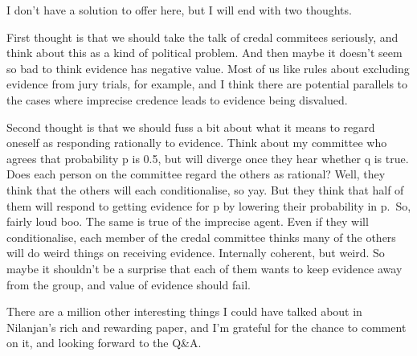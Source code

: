 \documentclass[
  12pt,
]{article}
\begin{document}
I don't have a solution to offer here, but I will end with two thoughts.

First thought is that we should take the talk of credal commitees
seriously, and think about this as a kind of political problem. And then
maybe it doesn't seem so bad to think evidence has negative value. Most
of us like rules about excluding evidence from jury trials, for example,
and I think there are potential parallels to the cases where imprecise
credence leads to evidence being disvalued.

Second thought is that we should fuss a bit about what it means to
regard oneself as responding rationally to evidence. Think about my
committee who agrees that probability p is 0.5, but will diverge once
they hear whether q is true. Does each person on the committee regard
the others as rational? Well, they think that the others will each
conditionalise, so yay. But they think that half of them will respond to
getting evidence for p by lowering their probability in p.~So, fairly
loud boo. The same is true of the imprecise agent. Even if they will
conditionalise, each member of the credal committee thinks many of the
others will do weird things on receiving evidence. Internally coherent,
but weird. So maybe it shouldn't be a surprise that each of them wants
to keep evidence away from the group, and value of evidence should fail.

There are a million other interesting things I could have talked about
in Nilanjan's rich and rewarding paper, and I'm grateful for the chance
to comment on it, and looking forward to the Q\&A.
\end{document}
